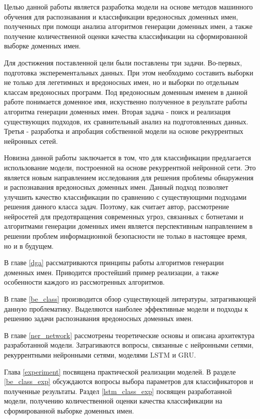 Целью данной работы является разработка модели на основе методов машинного обучения для распознавания и классификации вредоносных доменных имен, полученных при помощи анализа алгоритмов генерации доменных имен, а также получение количественной оценки качества классификации на сформированной выборке доменных имен.

Для достижения поставленной цели были поставлены три задачи. Во-первых, подготовка эксперементальных данных. При этом необходимо составить выборки не только для легетимных и вредоносных имен, но и выборки по отдельным классам вредоносных программ. Под вредоносным доменным именем в данной работе понимается доменное имя, искуственно полученное в результате работы алгоритма генерации доменных имен. Вторая задача - поиск и реализация существующих подходов, их сравнительный анализ на подготовленных данных. Третья - разработка и апробация собственной модели на основе рекуррентных нейронных сетей.

Новизна данной работы заключается в том, что для классификации предлагается использование модели, построенной на основе рекуррентной нейронной сети. Это является новым направлением исследования для решения проблемы обнаружения и распознавания вредоносных доменных имен. Данный подход позволяет улучшить качество классификации по сравнению с существующими подходами решения данного класса задач. Поэтому, как считает автор, рассмотрение нейросетей для предотвращения современных угроз, связанных с ботнетами и алгоритмами генерации доменных имен является перспективным направлением в решении проблем информационной безопасности не только в настоящее время, но и в будущем.

В главе \ref{dga} рассматриваются принципы работы алгоритмов генерации доменных имен. Приводится простейший пример реализации, а также особенности каждого из рассмотренных алгоритмов.

В главе \ref{be_class} производится обзор существующей литературы, затрагивающей данную проблематику. Выделяются наиболее эффективные модели и подходы к решению задачи распознавания вредоносных доменных имен.

В главе \ref{ner_network} рассмотрены теоретические основы и описана архитектура разработанной модели. Затрагиваются вопросы, связанные с нейронными сетями, рекуррентными нейронными сетями, моделями LSTM и GRU.

Глава \ref{experiment} посвящена практической реализации моделей. В разделе \ref{be_class_exp} обсуждаются вопросы выбора параметров для классификаторов и полученные результаты. Раздел \ref{lstm_class_exp} посвящен разработанной модели, получению количественной оценки качества классификации на сформированной выборке доменных имен.
\clearpage